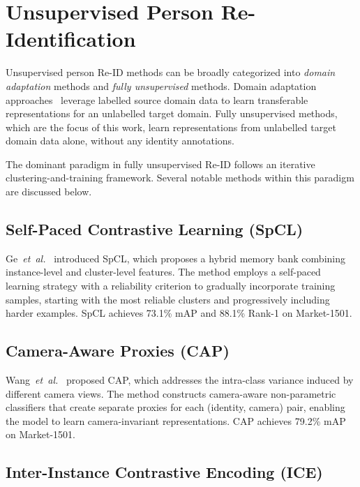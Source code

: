 
\section{Unsupervised Person Re-Identification}

Unsupervised person Re-ID methods can be broadly categorized into \textit{domain adaptation} methods and \textit{fully unsupervised} methods. Domain adaptation approaches~\cite{zheng2017unlabeled} leverage labelled source domain data to learn transferable representations for an unlabelled target domain. Fully unsupervised methods, which are the focus of this work, learn representations from unlabelled target domain data alone, without any identity annotations.

The dominant paradigm in fully unsupervised Re-ID follows an iterative clustering-and-training framework. Several notable methods within this paradigm are discussed below.

\subsection{Self-Paced Contrastive Learning (SpCL)}

Ge~\textit{et~al.}~\cite{ge2020selfpaced} introduced SpCL, which proposes a hybrid memory bank combining instance-level and cluster-level features. The method employs a self-paced learning strategy with a reliability criterion to gradually incorporate training samples, starting with the most reliable clusters and progressively including harder examples. SpCL achieves 73.1\% mAP and 88.1\% Rank-1 on Market-1501.

\subsection{Camera-Aware Proxies (CAP)}

Wang~\textit{et~al.}~\cite{wang2021cap} proposed CAP, which addresses the intra-class variance induced by different camera views. The method constructs camera-aware non-parametric classifiers that create separate proxies for each (identity, camera) pair, enabling the model to learn camera-invariant representations. CAP achieves 79.2\% mAP on Market-1501.

\subsection{Inter-Instance Contrastive Encoding (ICE)}

